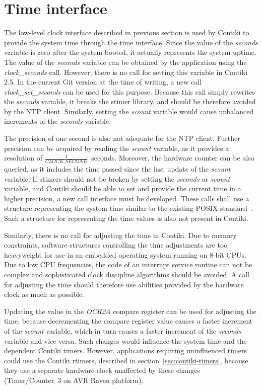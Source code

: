 
\section{Time interface}\label{sec:analysis-time}
The low-level clock interface described in previous section
is used by Contiki to provide the system time through the time interface.
Since the value of the {\it{seconds}} variable is zero after the system booted,
it actually represents the system uptime.
The value of the {\it{seconds}} variable can be obtained by the application using the {\it{clock\_seconds}} call.
However, there is no call for setting this variable in Contiki 2.5.
In the current Git version at the time of writing, a new call {\it{clock\_set\_seconds}}
can be used for this purpose.
Because this call simply rewrites the {\it{seconds}} variable, it breaks the stimer library,
and should be therefore avoided by the NTP client.
Similarly, setting the {\it{scount}} variable would cause
unbalanced increments of the {\it{seconds}} variable.

The precision of one second is also not adequate for the NTP client.
Further precision can be acquired by reading the {\it{scount}} variable,
as it provides a resolution of $\frac{1}{CLOCK\_SECOND}$~seconds.
Moreover, the hardware counter can be also queried, as it includes the time passed since
the last update of the {\it{scount}} variable.
If stimers should not be broken by setting the {\it{seconds}} or {\it{scount}} variable,
and Contiki should be able to set and provide the current time in a higher precision,
a new call interface must be developed.
These calls shall use a structure representing the system time similar
to the existing POSIX standard~\cite{posix}.
Such a structure for representing the time values is also not present in Contiki.

Similarly, there is no call for adjusting the time in Contiki.
Due to memory constraints, software structures controlling the time adjustments are too heavyweight
for use in an embedded operating system running on 8-bit CPUs.
Due to low CPU frequencies, the code of an interrupt service routine can not be complex
and sophisticated clock discipline algorithms should be avoided.
A call for adjusting the time should therefore use abilities
provided by the hardware clock as much as possible.

Updating the value in the {\it{OCR2A}} compare register
can be used for adjusting the time, because decrementing the compare register
value causes a faster increment of the {\it{scount}} variable, which in turn causes
a faster increment of the {\it{seconds}} variable and vice versa.
Such changes would influence the system time and the dependent Contiki timers.
However, applications requiring uninfluenced timers
could use the Contiki rtimers, described in section~\ref{sec:contiki-timers},
because they use a separate hardware clock unaffected by these changes
(Timer/Counter~3 on AVR Raven platform).

